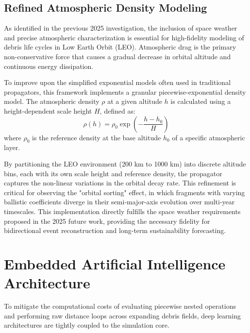 \documentclass[letterpaper, preprint, 11pt]{AAS}
\begin{document}
\subsection{Refined Atmospheric Density Modeling}
As identified in the previous 2025 investigation, the inclusion of space weather and precise atmospheric characterization is essential for high-fidelity modeling of debris life cycles in Low Earth Orbit (LEO). Atmospheric drag is the primary non-conservative force that causes a gradual decrease in orbital altitude and continuous energy dissipation. 

To improve upon the simplified exponential models often used in traditional propagators, this framework implements a granular piecewise-exponential density model. The atmospheric density $\rho$ at a given altitude $h$ is calculated using a height-dependent scale height $H$, defined as:
\begin{equation}
    \rho(h) = \rho_{0} \exp\left( -\frac{h - h_{0}}{H} \right)
\end{equation}
where $\rho_0$ is the reference density at the base altitude $h_0$ of a specific atmospheric layer. 

By partitioning the LEO environment (200 km to 1000 km) into discrete altitude bins, each with its own scale height and reference density, the propagator captures the non-linear variations in the orbital decay rate. This refinement is critical for observing the "orbital sorting" effect, in which fragments with varying ballistic coefficients diverge in their semi-major-axis evolution over multi-year timescales. This implementation directly fulfills the space weather requirements proposed in the 2025 future work, providing the necessary fidelity for bidirectional event reconstruction and long-term sustainability forecasting.

\section{Embedded Artificial Intelligence Architecture}
\label{sec:ai_architecture}

To mitigate the computational costs of evaluating piecewise nested operations and performing raw distance loops across expanding debris fields, deep learning architectures are tightly coupled to the 
simulation core.
\end{document}
